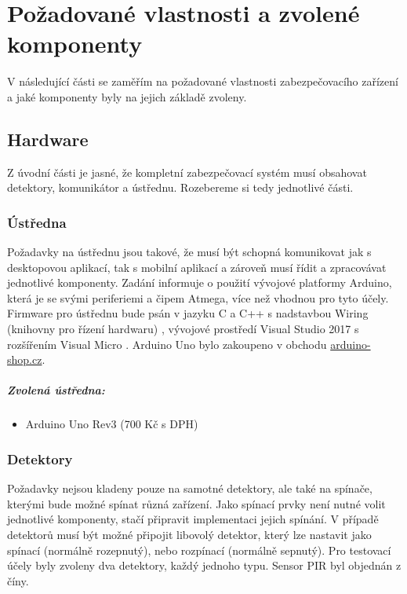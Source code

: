 \documentclass[FM,MP]{tulthesis}  %
\begin{document}

\chapter{Požadované vlastnosti a zvolené komponenty}
V následující části se zaměřím na požadované vlastnosti zabezpečovacího zařízení a jaké komponenty byly na jejich základě zvoleny.

\section{Hardware}
Z úvodní části je jasné, že kompletní zabezpečovací systém musí obsahovat detektory, komunikátor a ústřednu. Rozebereme si tedy jednotlivé části.

\subsection{Ústředna}
Požadavky na ústřednu jsou takové, že musí být schopná komunikovat jak s desktopovou aplikací, tak s mobilní aplikací a zároveň musí řídit a zpracovávat jednotlivé komponenty. Zadání informuje o použití vývojové platformy Arduino, která je se svými periferiemi a čipem Atmega, více než vhodnou pro tyto účely. Firmware pro ústřednu bude psán v jazyku  C a C++ s nadstavbou Wiring (knihovny pro řízení hardwaru) \cite{Wiring}, vývojové prostředí Visual Studio 2017 s rozšířením Visual Micro \cite{Visual Micro}. Arduino Uno bylo zakoupeno v obchodu \url{arduino-shop.cz}.

\paragraph{Zvolená ústředna:}
\begin{itemize}
\item Arduino Uno Rev3 (700 Kč s DPH)
\end{itemize} 

\subsection{Detektory}
Požadavky nejsou kladeny pouze na samotné detektory, ale také na spínače, kterými bude možné spínat různá zařízení. Jako spínací prvky není nutné volit jednotlivé komponenty, stačí připravit implementaci jejich spínání. V případě detektorů musí být možné připojit libovolý detektor, který lze nastavit jako spínací (normálně rozepnutý), nebo rozpínací (normálně sepnutý). Pro testovací účely byly zvoleny dva detektory, každý jednoho typu. Sensor PIR byl objednán z číny.
\end{document}
